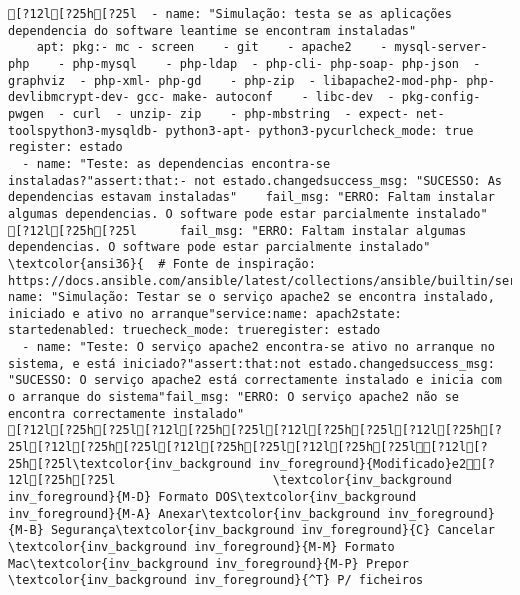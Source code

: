 \documentclass{scrartcl}
\begin{document}
\begin{Verbatim}
[?12l[?25h[?25l  - name: "Simulação: testa se as aplicações dependencia do software leantime se encontram instaladas"
    apt: pkg:- mc - screen    - git    - apache2    - mysql-server- php    - php-mysql    - php-ldap  - php-cli- php-soap- php-json  - graphviz  - php-xml- php-gd    - php-zip  - libapache2-mod-php- php-devlibmcrypt-dev- gcc- make- autoconf    - libc-dev  - pkg-config- pwgen  - curl  - unzip- zip    - php-mbstring  - expect- net-toolspython3-mysqldb- python3-apt- python3-pycurlcheck_mode: true  register: estado
  - name: "Teste: as dependencias encontra-se instaladas?"assert:that:- not estado.changedsuccess_msg: "SUCESSO: As dependencias estavam instaladas"    fail_msg: "ERRO: Faltam instalar algumas dependencias. O software pode estar parcialmente instalado"
[?12l[?25h[?25l      fail_msg: "ERRO: Faltam instalar algumas dependencias. O software pode estar parcialmente instalado"
\textcolor{ansi36}{  # Fonte de inspiração: https://docs.ansible.com/ansible/latest/collections/ansible/builtin/service_module.html}- name: "Simulação: Testar se o serviço apache2 se encontra instalado, iniciado e ativo no arranque"service:name: apach2state: startedenabled: truecheck_mode: trueregister: estado
  - name: "Teste: O serviço apache2 encontra-se ativo no arranque no sistema, e está iniciado?"assert:that:not estado.changedsuccess_msg: "SUCESSO: O serviço apache2 está correctamente instalado e inicia com o arranque do sistema"fail_msg: "ERRO: O serviço apache2 não se encontra correctamente instalado"
[?12l[?25h[?25l[?12l[?25h[?25l[?12l[?25h[?25l[?12l[?25h[?25l[?12l[?25h[?25l[?12l[?25h[?25l[?12l[?25h[?25l[?12l[?25h[?25l\textcolor{inv_background inv_foreground}{Modificado}e2[?12l[?25h[?25l                      \textcolor{inv_background inv_foreground}{M-D} Formato DOS\textcolor{inv_background inv_foreground}{M-A} Anexar\textcolor{inv_background inv_foreground}{M-B} Segurança\textcolor{inv_background inv_foreground}{C} Cancelar                        \textcolor{inv_background inv_foreground}{M-M} Formato Mac\textcolor{inv_background inv_foreground}{M-P} Prepor         \textcolor{inv_background inv_foreground}{^T} P/ ficheiros

\end{Verbatim}
\end{document}
